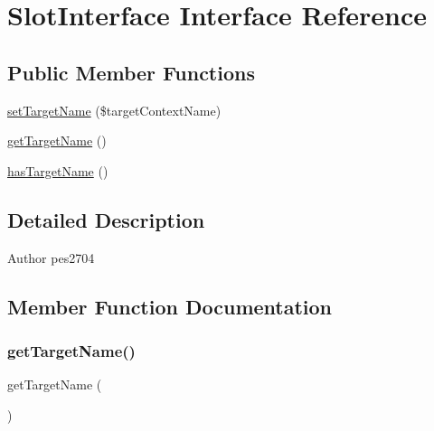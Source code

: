 \hypertarget{interface_pes_1_1_document_1_1_slot_interface}{}\section{Slot\+Interface Interface Reference}
\label{interface_pes_1_1_document_1_1_slot_interface}
\subsection*{Public Member Functions}
\begin{DoxyCompactItemize}
\item 
\mbox{\hyperlink{interface_pes_1_1_document_1_1_slot_interface_ab2d062d8d5a2afbfa26c76004ea853fe}{set\+Target\+Name}} (\$target\+Context\+Name)
\item 
\mbox{\hyperlink{interface_pes_1_1_document_1_1_slot_interface_a33df306a1f1ceb3adcffbddfc87b04dd}{get\+Target\+Name}} ()
\item 
\mbox{\hyperlink{interface_pes_1_1_document_1_1_slot_interface_a46620ed4fe2d28cd0f4627f9aa301dbc}{has\+Target\+Name}} ()
\end{DoxyCompactItemize}


\subsection{Detailed Description}
\begin{DoxyAuthor}{Author}
pes2704 
\end{DoxyAuthor}


\subsection{Member Function Documentation}
\mbox{\label{interface_pes_1_1_document_1_1_slot_interface_a33df306a1f1ceb3adcffbddfc87b04dd}} 
\subsubsection{\texorpdfstring{get\+Target\+Name()}{getTargetName()}}
{\footnotesize\ttfamily get\+Target\+Name (\begin{DoxyParamCaption}{ }\end{DoxyParamCaption})}

